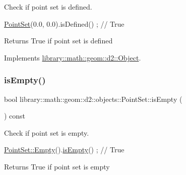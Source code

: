 Check if point set is defined. 


\begin{DoxyCode}
\hyperlink{classlibrary_1_1math_1_1geom_1_1d2_1_1objects_1_1_point_set_a1b27139683b5b3418188e3eae1385618}{PointSet}(0.0, 0.0).isDefined() ; \textcolor{comment}{// True}
\end{DoxyCode}


\begin{DoxyReturn}{Returns}
True if point set is defined 
\end{DoxyReturn}


Implements \hyperlink{classlibrary_1_1math_1_1geom_1_1d2_1_1_object_ae9506254971168a3ca63e1923556b70d}{library\+::math\+::geom\+::d2\+::\+Object}.

\mbox{\label{classlibrary_1_1math_1_1geom_1_1d2_1_1objects_1_1_point_set_af81b5c7b407db5fc7021f71ab10497ea}} 
\subsubsection{\texorpdfstring{is\+Empty()}{isEmpty()}}
{\footnotesize\ttfamily bool library\+::math\+::geom\+::d2\+::objects\+::\+Point\+Set\+::is\+Empty (\begin{DoxyParamCaption}{ }\end{DoxyParamCaption}) const}



Check if point set is empty. 


\begin{DoxyCode}
\hyperlink{classlibrary_1_1math_1_1geom_1_1d2_1_1objects_1_1_point_set_af09fa6d8bce9f64b150c739e1ed7bfc6}{PointSet::Empty}().\hyperlink{classlibrary_1_1math_1_1geom_1_1d2_1_1objects_1_1_point_set_af81b5c7b407db5fc7021f71ab10497ea}{isEmpty}() ; \textcolor{comment}{// True}
\end{DoxyCode}


\begin{DoxyReturn}{Returns}
True if point set is empty 
\end{DoxyReturn}
\mbox{\label{classlibrary_1_1math_1_1geom_1_1d2_1_1objects_1_1_point_set_a8aba7c99e93720ba291abef2ded25cc7}} 
